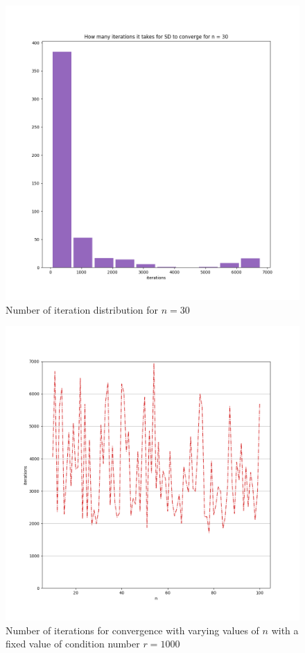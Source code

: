 \documentclass[11pt]{article}
\begin{document}
\begin{figure}[!htbp]
    \includegraphics[width=\textwidth]{./niter_fix_n_30.png}
    \caption{Number of iteration distribution for $n=30$\label{fig:niter_30}}
\end{figure}
\begin{figure}[!htbp]
    \includegraphics[width=\textwidth]{./niter_fix_r.png}
    \caption{Number of iterations for convergence with varying values of $n$
    with a fixed value of condition number $r=1000$\label{fig:condition}}
\end{figure}
\end{document}
